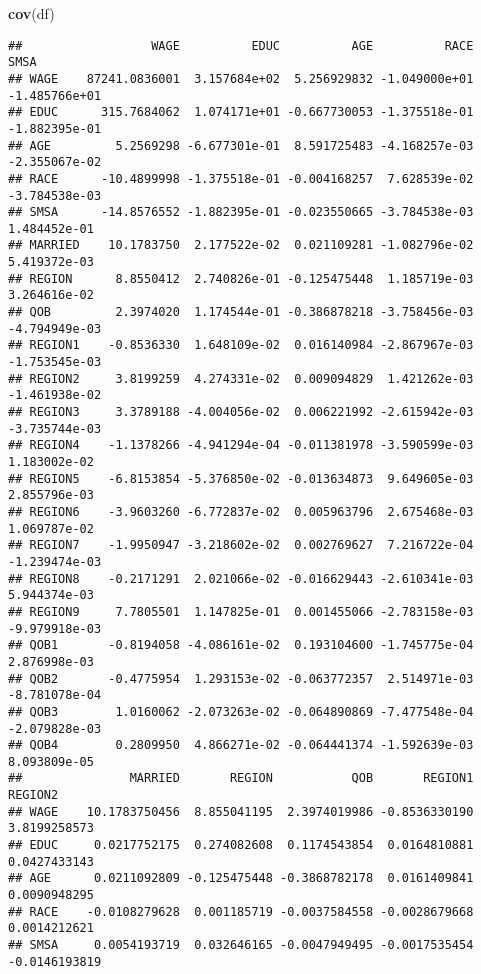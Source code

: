 \documentclass[
]{article}
\newenvironment{Shaded}{\begin{snugshade}}{\end{snugshade}}
\newcommand{\FunctionTok}[1]{\textcolor[rgb]{0.13,0.29,0.53}{\textbf{#1}}}
\newcommand{\NormalTok}[1]{#1}
\begin{document}
\begin{Shaded}
\begin{Highlighting}[]
\FunctionTok{cov}\NormalTok{(df)}
\end{Highlighting}
\end{Shaded}

\begin{verbatim}
##                  WAGE          EDUC          AGE          RACE          SMSA
## WAGE    87241.0836001  3.157684e+02  5.256929832 -1.049000e+01 -1.485766e+01
## EDUC      315.7684062  1.074171e+01 -0.667730053 -1.375518e-01 -1.882395e-01
## AGE         5.2569298 -6.677301e-01  8.591725483 -4.168257e-03 -2.355067e-02
## RACE      -10.4899998 -1.375518e-01 -0.004168257  7.628539e-02 -3.784538e-03
## SMSA      -14.8576552 -1.882395e-01 -0.023550665 -3.784538e-03  1.484452e-01
## MARRIED    10.1783750  2.177522e-02  0.021109281 -1.082796e-02  5.419372e-03
## REGION      8.8550412  2.740826e-01 -0.125475448  1.185719e-03  3.264616e-02
## QOB         2.3974020  1.174544e-01 -0.386878218 -3.758456e-03 -4.794949e-03
## REGION1    -0.8536330  1.648109e-02  0.016140984 -2.867967e-03 -1.753545e-03
## REGION2     3.8199259  4.274331e-02  0.009094829  1.421262e-03 -1.461938e-02
## REGION3     3.3789188 -4.004056e-02  0.006221992 -2.615942e-03 -3.735744e-03
## REGION4    -1.1378266 -4.941294e-04 -0.011381978 -3.590599e-03  1.183002e-02
## REGION5    -6.8153854 -5.376850e-02 -0.013634873  9.649605e-03  2.855796e-03
## REGION6    -3.9603260 -6.772837e-02  0.005963796  2.675468e-03  1.069787e-02
## REGION7    -1.9950947 -3.218602e-02  0.002769627  7.216722e-04 -1.239474e-03
## REGION8    -0.2171291  2.021066e-02 -0.016629443 -2.610341e-03  5.944374e-03
## REGION9     7.7805501  1.147825e-01  0.001455066 -2.783158e-03 -9.979918e-03
## QOB1       -0.8194058 -4.086161e-02  0.193104600 -1.745775e-04  2.876998e-03
## QOB2       -0.4775954  1.293153e-02 -0.063772357  2.514971e-03 -8.781078e-04
## QOB3        1.0160062 -2.073263e-02 -0.064890869 -7.477548e-04 -2.079828e-03
## QOB4        0.2809950  4.866271e-02 -0.064441374 -1.592639e-03  8.093809e-05
##               MARRIED       REGION           QOB       REGION1       REGION2
## WAGE    10.1783750456  8.855041195  2.3974019986 -0.8536330190  3.8199258573
## EDUC     0.0217752175  0.274082608  0.1174543854  0.0164810881  0.0427433143
## AGE      0.0211092809 -0.125475448 -0.3868782178  0.0161409841  0.0090948295
## RACE    -0.0108279628  0.001185719 -0.0037584558 -0.0028679668  0.0014212621
## SMSA     0.0054193719  0.032646165 -0.0047949495 -0.0017535454 -0.0146193819

\end{verbatim}
\end{document}
